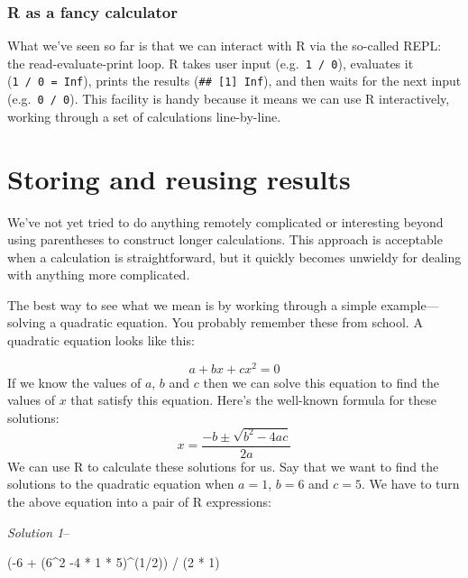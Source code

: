 \documentclass[
]{book}
\newenvironment{Shaded}{\begin{snugshade}}{\end{snugshade}}
\newcommand{\DecValTok}[1]{\textcolor[rgb]{0.00,0.00,0.81}{#1}}
\newcommand{\NormalTok}[1]{#1}
\newcommand{\SpecialCharTok}[1]{\textcolor[rgb]{0.00,0.00,0.00}{#1}}
\newenvironment{greybox}{
  \definecolor{shadecolor}{rgb}{0.95,0.95,0.95}  %
  \color{black}
  \begin{shaded}}
 {\end{shaded}}
\newenvironment{infobox}[1]
  {
  \begin{itemize}
  \renewcommand{\labelitemi}{
    \raisebox{-.7\height}[0pt][0pt]{
      {\setkeys{Gin}{width=3em,keepaspectratio}
        \texttt{[image: images/\#1]}}
    }
  }
  \setlength{\fboxsep}{1em}
  \begin{greybox}
  \item
  }
  {
  \end{greybox}
  \end{itemize}
  }
\begin{document}
\begin{infobox}{information}

\hypertarget{r-as-a-fancy-calculator}{%
\subsubsection*{R as a fancy calculator}\label{r-as-a-fancy-calculator}}

What we've seen so far is that we can interact with R via the so-called REPL: the read-evaluate-print loop. R takes user input (e.g.~\texttt{1\ /\ 0}), evaluates it (\texttt{1\ /\ 0\ =\ Inf}), prints the results (\texttt{\#\#\ {[}1{]}\ Inf}), and then waits for the next input (e.g.~\texttt{0\ /\ 0}). This facility is handy because it means we can use R interactively, working through a set of calculations line-by-line.

\end{infobox}

\hypertarget{assignment}{%
\section{Storing and reusing results}\label{assignment}}

We've not yet tried to do anything remotely complicated or interesting beyond using parentheses to construct longer calculations. This approach is acceptable when a calculation is straightforward, but it quickly becomes unwieldy for dealing with anything more complicated.

The best way to see what we mean is by working through a simple example---solving a quadratic equation. You probably remember these from school. A quadratic equation looks like this:

\[a + bx + cx^2 = 0\] If we know the values of \(a\), \(b\) and \(c\) then we can solve this equation to find the values of \(x\) that satisfy this equation. Here's the well-known formula for these solutions: \[
x = \frac{-b\pm\sqrt{b^2-4ac}}{2a}
\] We can use R to calculate these solutions for us. Say that we want to find the solutions to the quadratic equation when \(a=1\), \(b=6\) and \(c=5\). We have to turn the above equation into a pair of R expressions:

\emph{Solution 1}--

\begin{Shaded}
\begin{Highlighting}[]
\NormalTok{(}\SpecialCharTok{{-}}\DecValTok{6} \SpecialCharTok{+}\NormalTok{ (}\DecValTok{6}\SpecialCharTok{\^{}}\DecValTok{2} \SpecialCharTok{{-}}\DecValTok{4} \SpecialCharTok{*} \DecValTok{1} \SpecialCharTok{*} \DecValTok{5}\NormalTok{)}\SpecialCharTok{\^{}}\NormalTok{(}\DecValTok{1}\SpecialCharTok{/}\DecValTok{2}\NormalTok{)) }\SpecialCharTok{/}\NormalTok{ (}\DecValTok{2} \SpecialCharTok{*} \DecValTok{1}\NormalTok{)}
\end{Highlighting}
\end{Shaded}
\end{document}
